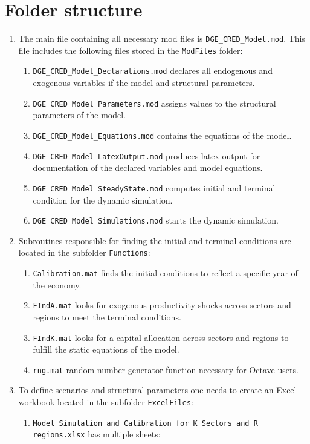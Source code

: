 \documentclass[10pt,a4paper]{article}
\begin{document}
\section{Folder structure}
\begin{enumerate}
\item The main file containing all necessary mod files is {\tt DGE_CRED_Model.mod}. This file includes the following files stored in the {\tt ModFiles} folder:
\begin{enumerate}
\item {\tt DGE_CRED_Model_Declarations.mod} declares all endogenous and exogenous variables if the model and structural parameters.
\item {\tt DGE_CRED_Model_Parameters.mod} assigns values to the structural parameters of the model.
\item {\tt DGE_CRED_Model_Equations.mod} contains the equations of the model.
\item {\tt DGE_CRED_Model_LatexOutput.mod} produces latex output for documentation of the declared variables and model equations.
\item {\tt DGE_CRED_Model_SteadyState.mod} computes initial and terminal condition for the dynamic simulation.
\item {\tt DGE_CRED_Model_Simulations.mod} starts the dynamic simulation.
\end{enumerate}
\item Subroutines responsible for finding the initial and terminal conditions are located in the subfolder {\tt Functions}:
\begin{enumerate}
\item {\tt Calibration.mat} finds the initial conditions to reflect a specific year of the economy.
\item {\tt FIndA.mat} looks for exogenous productivity shocks across sectors and regions to meet the terminal conditions.
\item {\tt FIndK.mat} looks for a capital allocation across sectors and regions to fulfill the static equations of the model.
\item {\tt rng.mat} random number generator function necessary for Octave users.
\end{enumerate}
\item To define scenarios and structural parameters one needs to create an Excel workbook located in the subfolder {\tt ExcelFiles}:
\begin{enumerate}
\item {\tt Model Simulation and Calibration for K Sectors and R regions.xlsx} has multiple sheets:

\end{enumerate}
\end{enumerate}
\end{document}
